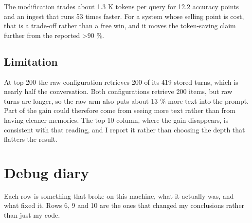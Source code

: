 \documentclass[11pt,a4paper]{article}
\begin{document}
The modification trades about 1.3 K tokens per query for 12.2 accuracy points and an ingest that runs 53 times faster. For a system whose selling point is cost, that is a trade-off rather than a free win, and it moves the token-saving claim further from the reported >90 \%.

\subsection{Limitation}

At top-200 the raw configuration retrieves 200 of its 419 stored turns, which is nearly half the conversation. Both configurations retrieve 200 items, but raw turns are longer, so the raw arm also puts about 13 \% more text into the prompt. Part of the gain could therefore come from seeing more text rather than from having cleaner memories. The top-10 column, where the gain disappears, is consistent with that reading, and I report it rather than choosing the depth that flatters the result.

\section{Debug diary}

Each row is something that broke on this machine, what it actually was, and what fixed it. Rows 6, 9 and 10 are the ones that changed my conclusions rather than just my code.
\end{document}
